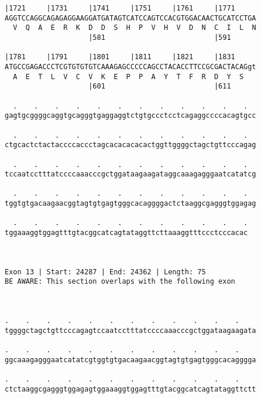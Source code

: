 \documentclass{article}
\begin{document}
\begin{Verbatim}
|1721     |1731     |1741     |1751     |1761     |1771     
AGGTCCAGGCAGAGAGGAAGGATGATAGTCATCCAGTCCACGTGGACAACTGCATCCTGA
  V  Q  A  E  R  K  D  D  S  H  P  V  H  V  D  N  C  I  L  N
                    |581                          |591      
  
|1781     |1791     |1801     |1811     |1821     |1831     
ATGCCGAGACCCTCGTGTGTGTCAAAGAGCCCCCAGCCTACACCTTCCGCGACTACAGgt
  A  E  T  L  V  C  V  K  E  P  P  A  Y  T  F  R  D  Y  S   
                    |601                          |611      
  
  .    .    .    .    .    .    .    .    .    .    .    .  
gagtgcggggcaggtgcagggtgaggaggtctgtgccctcctcagaggccccacagtgcc
                                                            
  .    .    .    .    .    .    .    .    .    .    .    .  
ctgcactctactaccccaccctagcacacacacactggttggggctagctgttcccagag
                                                            
  .    .    .    .    .    .    .    .    .    .    .    .  
tccaatcctttatccccaaacccgctggataagaagataggcaaagagggaatcatatcg
                                                            
  .    .    .    .    .    .    .    .    .    .    .    .  
tggtgtgacaagaacggtagtgtgagtgggcacaggggactctaaggcgagggtggagag
                                                            
  .    .    .    .    .    .    .    .    .    .    .    .
tggaaaggtggagtttgtacggcatcagtataggttcttaaaggtttccctcccacac
                                                          
                                                          
 
Exon 13 | Start: 24287 | End: 24362 | Length: 75
BE AWARE: This section overlaps with the following exon



.    .    .    .    .    .    .    .    .    .    .    .    
tggggctagctgttcccagagtccaatcctttatccccaaacccgctggataagaagata
                                                            
.    .    .    .    .    .    .    .    .    .    .    .    
ggcaaagagggaatcatatcgtggtgtgacaagaacggtagtgtgagtgggcacagggga
                                                            
.    .    .    .    .    .    .    .    .    .    .    .    
ctctaaggcgagggtggagagtggaaaggtggagtttgtacggcatcagtataggttctt
                                                            

\end{Verbatim}
\end{document}
